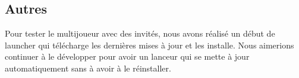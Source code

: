 \subsection{Autres}
    Pour tester le multijoueur avec des invités, nous avons réalisé 
    un début de launcher qui télécharge les dernières mises à jour et les installe.
    Nous aimerions continuer à le développer pour avoir un lanceur
    qui se mette à jour automatiquement sans à avoir à le réinstaller.
